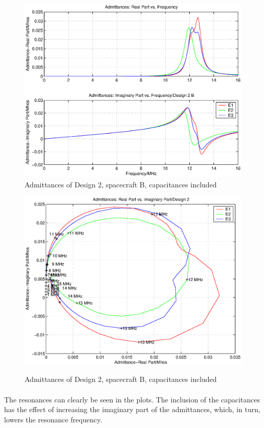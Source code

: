 \documentclass[a4paper,10pt]{thesis}
\begin{document}
\begin{figure}
\begin{center}
\includegraphics[scale=0.65]{AdmittancesD2B1_caps.eps}\\
\caption{Admittances of Design 2, spacecraft B, capacitances included} \label{fig_Admittance1_D2B_caps}
\includegraphics[scale=0.65]{AdmittancesD2B2_caps.eps} \\
\caption{Admittances of Design 2, spacecraft B, capacitances included} \label{fig_Admittance2_D2B_caps}
\end{center}
\end{figure}
\paragraph*{}
The resonances can clearly be seen in the plots. The inclusion of the capacitances has the effect of increasing the imaginary part of the admittances, which, in turn, lowers the resonance frequency.
\end{document}
